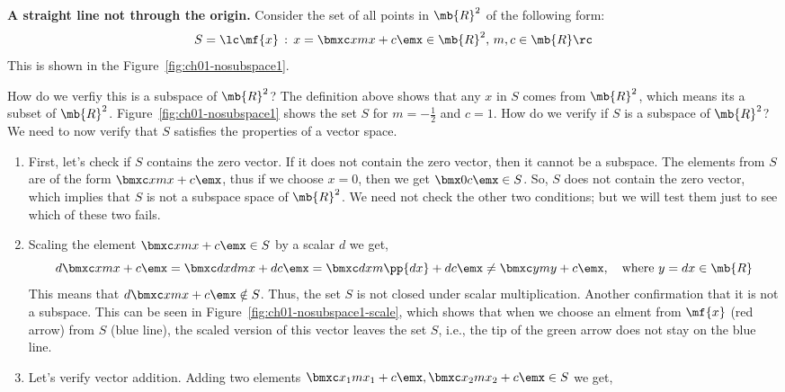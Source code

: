 \begin{boxedstuff}
\begin{example}
    \textbf{A straight line not through the origin.} Consider the set of all points in $\mb{R}^2$ of the following form:
    \[ S = \lc \mf{x} \, : \, x = \bmxc x \\ m x + c \emx \in \mb{R}^2, \, m, c \in \mb{R} \rc \]
    This is shown in the Figure~\ref{fig:ch01-nosubspace1}.

    How do we verfiy this is a subspace of $\mb{R}^2$? The definition above shows that any $x$ in $S$ comes from $\mb{R}^2$, which means its a subset of $\mb{R}^2$. Figure~\ref{fig:ch01-nosubspace1} shows the set $S$ for $m = -\frac{1}{2}$ and $c = 1$.
    \noindent How do we verify if $S$ is a subspace of $\mb{R}^2$? We need to now verify that $S$ satisfies the properties of a vector space.
    \begin{enumerate}
        \item First, let's check if $S$ contains the zero vector. If it does not contain the zero vector, then it cannot be a subspace. The elements from $S$ are of the form $\bmxc x \\ m x + c\emx$, thus if we choose $x = 0$, then we get $\bmx 0 \\ c \emx \in S$. So, $S$ does not contain the zero vector, which implies that $S$ is not a subspace space of $\mb{R}^2$. We need not check the other two conditions; but we will test them just to see which of these two fails.
        \item Scaling the element $\bmxc x \\ m x + c \emx \in S$ by a scalar $d$ we get,
        \[ d \bmxc x \\ m x + c\emx = \bmxc d x \\ d m x + d c \emx = \bmxc d x \\ m \pp{d x} + dc \emx \neq \bmxc y \\ m y + c\emx, \quad \text{where} \,\, y = d x \in \mb{R} \]
        This means that $d \bmxc x \\ m x + c\emx \notin S$. Thus, the set $S$ is not closed under scalar multiplication. Another confirmation that it is not a subspace. This can be seen in Figure~\ref{fig:ch01-nosubspace1-scale}, which shows that when we choose an elment from $\mf{x}$ (red arrow) from $S$ (blue line), the scaled version of this vector leaves the set $S$, i.e., the tip of the green arrow does not stay on the blue line.
        \item Let's verify vector addition. Adding two elements $\bmxc x_1 \\ m x_1 + c\emx, \bmxc x_2 \\ m x_2 + c\emx \in S$ we get,

\end{enumerate}
\end{example}
\end{boxedstuff}
